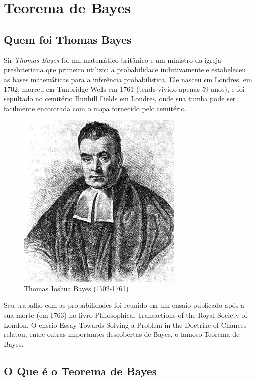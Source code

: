 \section{Teorema de Bayes}
\subsection{Quem foi Thomas Bayes}

Sir \emph{Thomas Bayes} foi um matemático britânico e um ministro
da igreja presbiteriana que primeiro utilizou a probabilidade
indutivamente e estabeleceu as bases matemáticas para a inferência
probabilística. Ele nasceu em Londres, em 1702, morreu em
Tunbridge Wells em 1761 (tendo vivido apenas 59 anos), e foi
sepultado no cemitério Bunhill Fields em Londres, onde sua tumba
pode ser facilmente encontrada com o mapa fornecido pelo
cemitério.


\vspace{-1.8cm}
\begin{figure}
    \centering
    \includegraphics[scale=0.6]{figures/Thomas_Bayes.jpeg}
    \caption{Thomas Joshua Bayes (1702-1761)}
    \label{fig:my_label2}
\end{figure}



Seu trabalho com as probabilidades foi reunido em um ensaio
publicado após a sua morte (em 1763) no livro Philosophical
Transactions of the Royal Society of London. O ensaio Essay
Towards Solving a Problem in the Doctrine of Chances relatou,
entre outras importantes descobertas de Bayes, o famoso Teorema de
Bayes.

\subsection{ O Que é o Teorema de Bayes}

